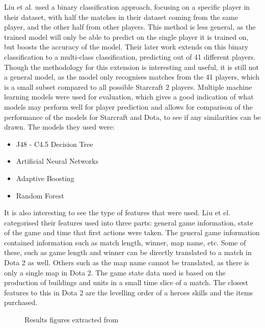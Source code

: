 \documentclass[Report.tex]{subfiles}
\begin{document}
Liu et al. used a binary classification approach, focusing on a specific player in their dataset, with half the matches in their dataset coming from the same player, and the other half from other players. This method is less general, as the trained model will only be able to predict on the single player it is trained on, but boosts the accuracy of the model. Their later work \cite{starcraft-actions} extends on this binary classification to a multi-class classification, predicting out of 41 different players. Though the methodology for this extension is interesting and useful, it is still not a general model, as the model only recognises matches from the 41 players, which is a small subset compared to all possible Starcraft 2 players. Multiple machine learning models were used for evaluation, which gives a good indication of what models may perform well for player prediction and allows for comparison of the performance of the models for Starcraft and Dota, to see if any similarities can be drawn. The models they used were:
\begin{itemize}
\item J48 - C4.5 Decision Tree
\item Artificial Neural Networks
\item Adaptive Boosting
\item Random Forest
\end{itemize}
It is also interesting to see the type of features that were used. Liu et el. categorised their features used into three parts: general game information, state of the game and time that first actions were taken. The general game information contained information such as match length, winner, map name, etc. Some of these, such as game length and winner can be directly translated to a match in Dota 2 as well. Others such as the map name cannot be translated, as there is only a single map in Dota 2. The game state data used is based on the production of buildings and units in a small time slice of a match. The closest features to this in Dota 2 are the levelling order of a heroes skills and the items purchased. 

\begin{figure}[H]
\centering
\begin{subfigure}{0.45\textwidth}
\end{subfigure}
\hspace{\fill}
\begin{subfigure}{0.45\textwidth}
\end{subfigure}
\caption{Results figures extracted from \cite{starcraft-identification}}
\end{figure}
\end{document}

